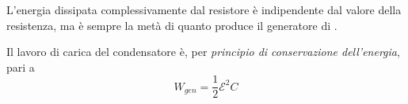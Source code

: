 \begin{observe}
	L'energia dissipata complessivamente dal resistore è indipendente dal valore della resistenza, ma è sempre la metà di quanto produce il generatore di \fem.
\end{observe}
Il lavoro di carica del condensatore è, per \textit{principio di conservazione dell'energia}, pari a 
\begin{equation}
	W_{gen}=\frac{1}{2}\mathcal{E}^2C
\end{equation}
